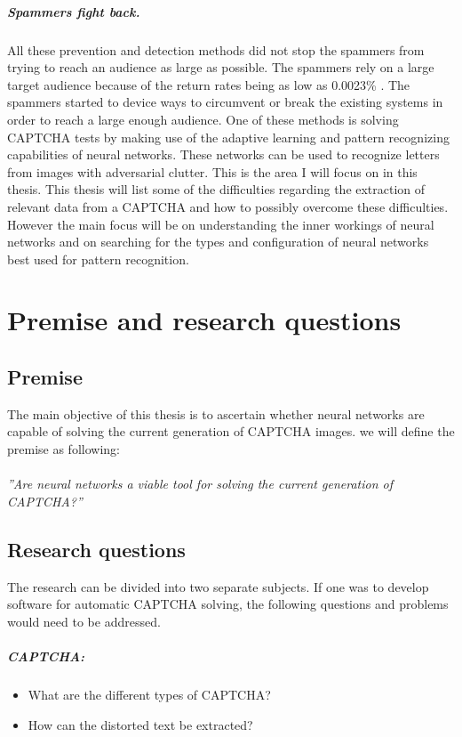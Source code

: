\documentclass[pdftex,a4paper,12pt,twoside]{report}
\theoremstyle{plain} \newtheorem{theorem}{Theorem} \newtheorem{proposition}{Proposition} \newtheorem{lemma}{Lemma} \newtheorem*{corollary}{Corollary}
\theoremstyle{definition} \newtheorem{definition}{Definition} \newtheorem{conjecture}{Conjecture} \newtheorem*{example}{Example} \newtheorem{algorithm}{Algorithm}
\theoremstyle{remark} \newtheorem*{remark}{Remark} \newtheorem*{note}{Note} \newtheorem{case}{Case}
\newcommand{\captcha}{CAPTCHA}
\begin{document}
\paragraph{Spammers fight back.}
All these prevention and detection methods did not stop the spammers from trying to reach an audience as large  as possible. The spammers rely on a large target audience because of the return rates being as low as 0.0023\% \citep{Cobb2003}. The spammers started to device ways to circumvent or break the existing systems in order to reach a large enough audience. One of these methods is solving CAPTCHA tests by making use of the adaptive learning and pattern recognizing capabilities of neural networks. These networks can be used to recognize letters from images with adversarial clutter.
This is the area I will focus on in this thesis. This thesis will list some of the difficulties regarding the extraction of relevant data from a CAPTCHA and how to possibly overcome these difficulties. However the main focus will be on understanding the inner workings of neural networks and on searching for the types and configuration of neural networks best used for pattern recognition.
\chapter{Premise and research questions}
\label{ch:Premise}
\section{Premise}
\label{sec:Premise}
The main objective of this thesis is to ascertain whether neural networks are capable of solving the current generation of CAPTCHA images. we will define the premise  as following:\\\\
\emph{''Are neural networks a viable tool for solving the current generation of CAPTCHA?''}
\section{Research questions}
\label{sec:researquestions}
The research can be divided into two separate subjects. If one was to develop software for automatic CAPTCHA solving, the following questions and problems would need to be addressed.
\paragraph{\captcha :}
\begin{itemize}
\item What are the different types of CAPTCHA?
\item How can the distorted text be extracted?
\end{itemize}
\end{document}
